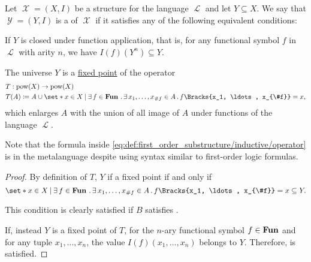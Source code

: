 \begin{definition}\label{def:first_order_substructure}
  Let \( \mscrX = (X, I) \) be a structure for the language \( \mscrL \) and let \( Y \subseteq X \). We say that \( \mscrY = (Y, I) \) is a  of \( \mscrX \) if it satisfies any of the following equivalent conditions:

  \begin{thmenum}
     If \( Y \) is closed under function application, that is, for any functional symbol \( f \) in \( \mscrL \) with arity \( n \), we have \( I(f)(Y^n) \subseteq Y \).

     The universe \( Y \) is a \hyperref[def:fixed_point]{fixed point} of the operator
    \begin{equation}\label{eq:def:first_order_substructure/inductive/operator}
      \begin{aligned}
        &T: \pow(X) \to \pow(X) \\
        &T(A) \coloneqq A \cup \set*{ x \in X \given \qexists{f \in \boldop{Fun}} \qexists{x_1, \ldots, x_{\#f} \in A} f\Bracks{x_1, \ldots, x_{\#f}} = x },
      \end{aligned}
    \end{equation}
    which enlarges \( A \) with the union of all image of \( A \) under functions of the language \( \mscrL \).

    Note that the formula inside \eqref{eq:def:first_order_substructure/inductive/operator} is in the metalanguage despite using syntax similar to first-order logic formulas.
  \end{thmenum}
\end{definition}
\begin{proof}
  By definition of \( T \), \( Y \) if a fixed point if and only if
  \begin{equation*}
    \set*{ x \in X \given \qexists{f \in \boldop{Fun}} \qexists{x_1, \ldots, x_{\#f} \in A} f\Bracks{x_1, \ldots, x_{\#f}} = x } \subseteq Y.
  \end{equation*}

  This condition is clearly satisfied if \( B \) satisfies .

  If, instead \( Y \) is a fixed point of \( T \), for the \( n \)-ary functional symbol \( f \in \operatorname{\mathbf{Fun}} \) and for any tuple \( x_1, \ldots, x_n \), the value \( I(f)(x_1, \ldots, x_n) \) belongs to \( Y \). Therefore,  is satisfied.
\end{proof}

